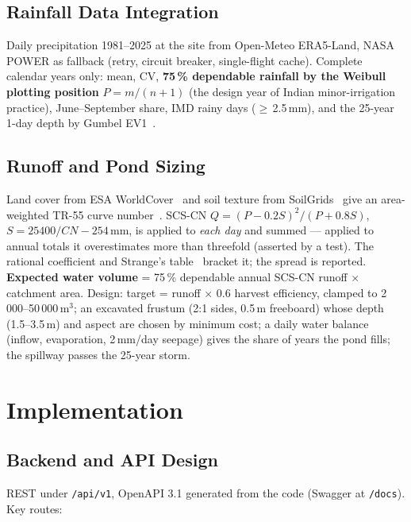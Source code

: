 \documentclass[manuscript,screen,review]{acmart}
\begin{document}
\subsection{Rainfall Data Integration}
Daily precipitation 1981--2025 at the site from Open-Meteo ERA5-Land, NASA POWER as fallback
(retry, circuit breaker, single-flight cache). Complete calendar years only: mean, CV, \textbf{75\,\% dependable rainfall by the Weibull plotting position}
$P=m/(n+1)$ (the design year of Indian minor-irrigation practice), June--September share, IMD
rainy days ($\ge$\,2.5\,mm), and the 25-year 1-day depth by Gumbel EV1~\cite{gumbel1958}.

\subsection{Runoff and Pond Sizing}
Land cover from ESA WorldCover~\cite{worldcover} and soil texture from SoilGrids~\cite{soilgrids}
give an area-weighted TR-55 curve number~\cite{tr55}. SCS-CN
$Q=(P-0.2S)^2/(P+0.8S)$, $S=25400/CN-254$\,mm, is applied to \emph{each day} and summed ---
applied to annual totals it overestimates more than threefold (asserted by a test). The
rational coefficient and Strange's table~\cite{subramanya} bracket it; the spread is reported.
\textbf{Expected water volume} = 75\,\% dependable annual SCS-CN runoff $\times$ catchment area.
Design: target = runoff $\times$ 0.6 harvest efficiency, clamped to 2\,000--50\,000\,m$^3$; an
excavated frustum (2:1 sides, 0.5\,m freeboard) whose depth (1.5--3.5\,m) and aspect are chosen
by minimum cost; a daily water balance (inflow, evaporation, 2\,mm/day seepage) gives the
share of years the pond fills; the spillway passes the 25-year storm.

\section{Implementation}\label{sec:implementation}
\subsection{Backend and API Design}
REST under \texttt{/api/v1}, OpenAPI 3.1 generated from the code (Swagger at \texttt{/docs}).
Key routes:
\end{document}
